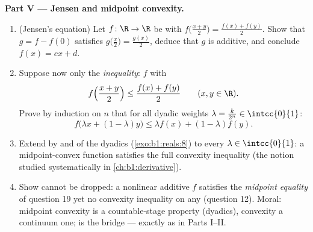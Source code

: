\begin{problem}[{Weekend problem --- $f(x + y) = f(x) + f(y)$:
regularity forces linearity, and the portrait of the monsters}]
\medskip
\noindent\textbf{Part V --- Jensen and midpoint convexity.}
\begin{enumerate}[resume]
  \item (Jensen's equation) Let $f \colon \R \to \R$ be
         with $f\bigl(\frac{x+y}{2}\bigr) = \frac{f(x)
        + f(y)}{2}$. Show that $g = f - f(0)$ satisfies
        $g\bigl(\frac x2\bigr) = \frac{g(x)}{2}$, deduce that
        $g$ is additive, and conclude $f(x) = cx + d$.
  \item Suppose now only the \emph{inequality}: $f$ 
        with
        \[
        f\Bigl(\frac{x + y}{2}\Bigr) \leq \frac{f(x) +
        f(y)}{2} \qquad (x, y \in \R).
        \]
        Prove by induction on $n$ that for all dyadic weights
        $\lambda = \frac{k}{2^n} \in \intcc{0}{1}$:
        \[
        f\bigl(\lambda x + (1 - \lambda)y\bigr) \leq \lambda
        f(x) + (1 - \lambda) f(y) .
        \]
  \item Extend by  and  of the dyadics
        (\cref{exo:b1:reals:8}) to every $\lambda \in
        \intcc{0}{1}$: a  midpoint-convex function
        satisfies the full convexity inequality (the notion
        studied systematically in \cref{ch:b1:derivative}).
  \item Show  cannot be dropped: a nonlinear additive
        $f$ satisfies the \emph{midpoint equality} of question
        19 yet no convexity inequality on any  (question
        12). Moral: midpoint convexity is a countable-stage
        property (dyadics), convexity a continuum one;
         is the bridge --- exactly as in Parts I--II.
\end{enumerate}


\end{problem}
